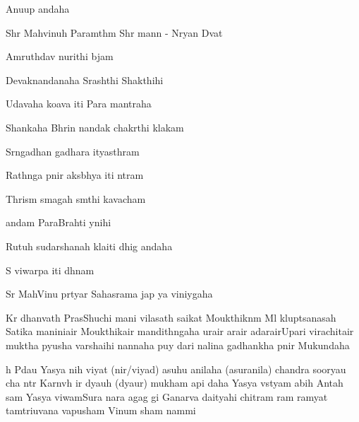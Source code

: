 \documentclass[20pt]{article}
\begin{document}
\SlokaHuge
{Anu{\sh}{\T}up {\ch}andaha}

\SlokaHuge
{Shr{\ee} Mah{\A}vi{\sh}nuh Param{\A}thm{\A}}
{Shr{\ee} mann - N{\A}r{\A}yan{\oh} D{\e}vat{\ha}}

\SlokaHuge
{Amruth{\am}{\sh}{\oo}d{\bh}av{\oh} nurithi  b{\ee}jam}

\SlokaHuge
{Devak{\ee}nandanaha Srash{\te}thi Shakthihi}

\SlokaHuge
{Ud{\bh}avaha k\y{\sh}{---}o{\bh}a}{{\de}va iti Para{\mo} mantraha}

\SlokaHuge
{Shankaha \dsh Bhrin nandak{\ee} chakr{\ee}thi k{\ee}lakam}

\SlokaHuge
{S{\ha}rngadhan{\va} ga{\da}dhara ityasthram}

\SlokaHuge
{Rath{\A}nga p{\A}nir aks{\ho}bhya iti n{\e}tram}

\SlokaHuge
{Thris{\A}m{\A} s{\A}magah s{\A}m{\e}thi kavacham}

\SlokaHuge
{{\An}andam ParaBrah{\me}ti y{\oh}nihi}

\SlokaHuge
{Rutuh sudarshanah k{\aaa}la}{iti dhig \dsh {\Bh}andaha}

\SlokaHuge
{S{\ri} vi{\sh}war{\oo}pa iti dh{\ya}nam}

\SlokaHuge
{Sr{\ee} Mah{\A}Vi{\sh}nu pr{\ee}tyar{\tH}{\e}}
{Sahasra{\na}ma jap{\e} {\Pa}{\ra}ya{\nE} viniy{\oh}gaha}

\newpage

\resetcountr
\novspace
{}

\SlokaHuge
{K{\sh}{\ee}r{\oh} dhanvath Pra{\de}s{\he}}{Shuchi mani vilasath saikat{\he} Moukthik{\A}n{\A}m}
{M{\A}l{\A} klupt{\ha}sanas{\tH}ah S{\ph}atika mani}{ni{\bh}air Moukthikair mandith{\aaa}ngaha}
{}
{{\Sh}u{\bh}rair a{\bh}rair ada{\bh}rair}{Upari virachitair muktha p{\ii}yusha varshaihi}
{{\A}nan{\di}naha pu{\nI}y{\A} dari nalina gadh{\A}}{{\Sh}ankha p{\A}nir Mukundaha}

\SlokaHuge
{{\Bh}{\oo}h P{\A}dau Yasya n{\A}{\bh}ih \dsh viyat (n{\A}{\bh}ir/viyad)}
{asuhu \dsh anilaha (asuranila{\sh}) chandra sooryau  cha n{\e}tr{\e}}
{Karn{\A}v{\aaa}{\sh}{\A}h {\sh}ir{\oh} dyauh (dyaur) mukham api daha{\no}}
{Yasya v{\aaa}st{\e}yam ab{\dH}ih}
{}
{Antah s{\tH}am Yasya vi{\sh}wam}{Sura nara {\kh}agag{\oh} {\Bh}{\oh}gi Gan{\dH}arva daitya{\ii}hi}
{chitram ram ramyat{\e} tam}{tri{\bh}uvana vapusham Vi{\sh}num {\ee}sham nam{\aaa}mi}
\end{document}
